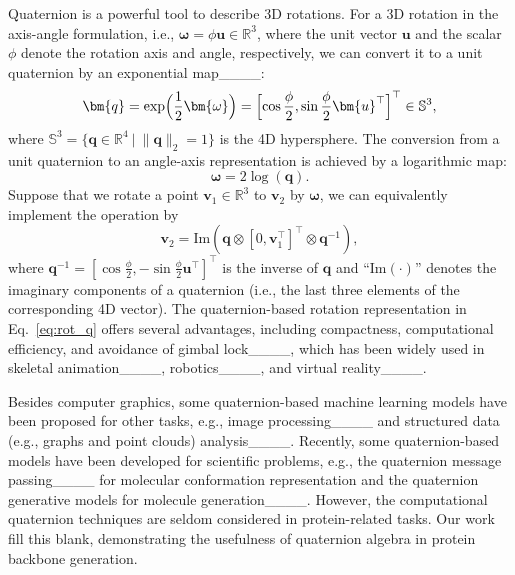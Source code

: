 Quaternion is a powerful tool to describe 3D rotations. 
For a 3D rotation in the axis-angle formulation, i.e., $\bm{\omega} = \phi \bm{u} \in \mathbb{R}^3$, where the unit vector $\bm{u}$ and the scalar $\phi$ denote the rotation axis and angle, respectively, we can convert it to a unit quaternion by an exponential map____:
\begin{equation}\label{eq:exp_map}
    \bm{q} = \exp\Bigl(\frac{1}{2} \bm{\omega}\Bigr) = \Bigl[\cos\frac{\phi}{2}, \sin\frac{\phi}{2}\bm{u}^\top\Bigr]^\top\in\mathbb{S}^3,
\end{equation}
where $\mathbb{S}^3=\{\bm{q}\in\mathbb{R}^4~|~\|\bm{q}\|_2=1\}$ is the 4D hypersphere.
The conversion from a unit quaternion to an angle-axis representation is achieved by a logarithmic map:
\begin{equation}\label{eq:log_map}
    \bm{\omega} = 2\log(\bm{q}).
\end{equation}
Suppose that we rotate a point $\bm{v}_1\in\mathbb{R}^3$ to $\bm{v}_2$ by $\bm{\omega}$, we can equivalently implement the operation by
\begin{equation}\label{eq:rot_q}
    \bm{v}_2 = \text{Im}(\bm{q} \otimes [0, \bm{v}_1^\top]^\top \otimes \bm{q}^{-1}),
\end{equation}
where $\bm{q}^{-1}=[\cos\frac{\phi}{2}, -\sin\frac{\phi}{2}\bm{u}^\top]^{\top}$ is the inverse of $\bm{q}$ and ``$\text{Im}(\cdot)$'' denotes the imaginary components of a quaternion (i.e., the last three elements of the corresponding 4D vector).
The quaternion-based rotation representation in Eq.~\ref{eq:rot_q} offers several advantages, including compactness, computational efficiency, and avoidance of gimbal lock____, which has been widely used in skeletal animation____, robotics____, and virtual reality____.

Besides computer graphics, some quaternion-based machine learning models have been proposed for other tasks, e.g., image processing____ and structured data (e.g., graphs and point clouds) analysis____.
Recently, some quaternion-based models have been developed for scientific problems, e.g., the quaternion message passing____ for molecular conformation representation and the quaternion generative models for molecule generation____.
However, the computational quaternion techniques are seldom considered in protein-related tasks.
Our work fill this blank, demonstrating the usefulness of quaternion algebra in protein backbone generation.

